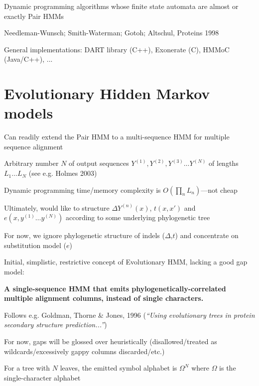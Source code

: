 \documentclass{beamer}
\begin{document}
\begin{frame}{}

\itemb
\item Dynamic programming algorithms whose finite state automata are almost or exactly Pair HMMs
 \itemb
 \item Needleman-Wunsch; Smith-Waterman; Gotoh; Altschul, Proteins 1998
 \item General implementations: DART library (C++), Exonerate (C), HMMoC (Java/C++), ...
 \iteme
\iteme

\end{frame}

\section{Evolutionary Hidden Markov models}
\label{sec:EvolutionaryHMM}

\begin{frame}{}

\itemb
\item Can readily extend the Pair HMM to a multi-sequence HMM for multiple sequence alignment
 \itemb
 \item Arbitrary number $N$ of output sequences $Y^{(1)}, Y^{(2)}, Y^{(3)} \ldots Y^{(N)}$ of lengths $L_1 \ldots L_N$ (see e.g. Holmes 2003)
 \item Dynamic programming time/memory complexity is $O(\prod_n L_n)$---not cheap
 \item Ultimately, would like to structure $\Delta Y^{(n)}(x)$, $t(x,x')$ and $e(x,y^{(1)} \ldots y^{(N)})$ according to some underlying phylogenetic tree
 \item For now, we ignore phylogenetic structure of indels ($\Delta$,$t$) and concentrate on substitution model ($e$)
 \iteme
\iteme
\end{frame}

\begin{frame}{}
\itemb
\item Initial, simplistic, restrictive concept of Evolutionary HMM, lacking a good gap model:
 \itemb
 \item {\bf A single-sequence HMM that emits phylogenetically-correlated multiple alignment columns, instead of single characters.}
 \item Follows e.g. Goldman, Thorne \& Jones, 1996 ({\em ``Using evolutionary trees in protein secondary structure prediction...''})
 \item For now, gaps will be glossed over heuristically (disallowed/treated as wildcards/excessively gappy columns discarded/etc.)
 \iteme
\item For a tree with $N$ leaves, the emitted symbol alphabet is $\Omega^N$ where $\Omega$ is the single-character alphabet
\iteme
\end{frame}
\end{document}
